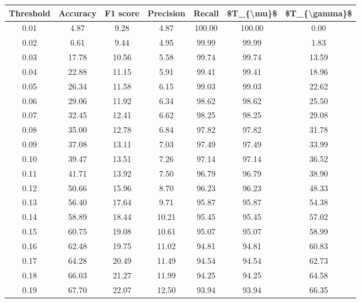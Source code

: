 \begin{tabular}{|c|c|c|c|c|c|c|}
\hline
 Threshold &  Accuracy &  F1 score &  Precision &  Recall &  \$T\_\{\textbackslash mu\}\$ &  \$T\_\{\textbackslash gamma\}\$ \\
\hline
      0.01 &      4.87 &      9.28 &       4.87 &  100.00 &     100.00 &          0.00 \\
      0.02 &      6.61 &      9.44 &       4.95 &   99.99 &      99.99 &          1.83 \\
      0.03 &     17.78 &     10.56 &       5.58 &   99.74 &      99.74 &         13.59 \\
      0.04 &     22.88 &     11.15 &       5.91 &   99.41 &      99.41 &         18.96 \\
      0.05 &     26.34 &     11.58 &       6.15 &   99.03 &      99.03 &         22.62 \\
      0.06 &     29.06 &     11.92 &       6.34 &   98.62 &      98.62 &         25.50 \\
      0.07 &     32.45 &     12.41 &       6.62 &   98.25 &      98.25 &         29.08 \\
      0.08 &     35.00 &     12.78 &       6.84 &   97.82 &      97.82 &         31.78 \\
      0.09 &     37.08 &     13.11 &       7.03 &   97.49 &      97.49 &         33.99 \\
      0.10 &     39.47 &     13.51 &       7.26 &   97.14 &      97.14 &         36.52 \\
      0.11 &     41.71 &     13.92 &       7.50 &   96.79 &      96.79 &         38.90 \\
      0.12 &     50.66 &     15.96 &       8.70 &   96.23 &      96.23 &         48.33 \\
      0.13 &     56.40 &     17.64 &       9.71 &   95.87 &      95.87 &         54.38 \\
      0.14 &     58.89 &     18.44 &      10.21 &   95.45 &      95.45 &         57.02 \\
      0.15 &     60.75 &     19.08 &      10.61 &   95.07 &      95.07 &         58.99 \\
      0.16 &     62.48 &     19.75 &      11.02 &   94.81 &      94.81 &         60.83 \\
      0.17 &     64.28 &     20.49 &      11.49 &   94.54 &      94.54 &         62.73 \\
      0.18 &     66.03 &     21.27 &      11.99 &   94.25 &      94.25 &         64.58 \\
      0.19 &     67.70 &     22.07 &      12.50 &   93.94 &      93.94 &         66.35 \\

\end{tabular}
